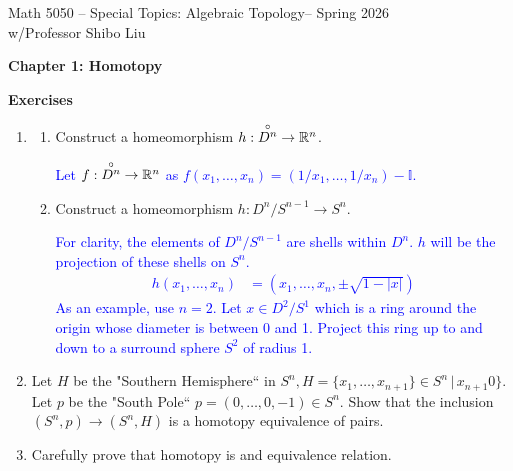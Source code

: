 \documentclass[12pt,a4paper]{report}
\newcommand{\CLASSNAME}{Math 5050 -- Special Topics: Algebraic Topology}
\newcommand{\PROFESSOR}{Professor Shibo Liu}
\newcommand{\SEMESTER}{Spring 2026}
\newcommand{\BLUE}[1]{\textcolor{blue}{#1}}
\newcommand{\OPEN}[1]{\overset{\circ}{#1}}
\begin{document}
\begin{center}
	\Large{\CLASSNAME -- \SEMESTER} \\
	\large{ w/\PROFESSOR}
\end{center}

\begin{center}
\textbf{\Large{Chapter 1: Homotopy}}
\end{center}

\HLINE

\noindent\textbf{Exercises}
\begin{enumerate}[label=1.3.\arabic*]
	\item \begin{enumerate}
		\item Construct a homeomorphism $h: \OPEN{D^n}\to \R^n$.
		
		\BLUE{Let $f: \OPEN{D^n}\to \R^n$ as $f(x_1, \dots, x_n) = (1/x_1, \dots, 1/x_n)-\mathbb{I}$.
		}
		\item Construct a homeomorphism $h: D^n/S^{n-1}\to S^n$.
		
		\BLUE{For clarity, the elements of $D^n/S^{n-1}$ are shells within $D^n$.  $h$ will be the projection of these shells on $S^n$.\begin{align*}
			h(x_1,\dots, x_n) &= (x_1,\dots, x_n, \pm\sqrt{1-|x|})
		\end{align*}As an example, use $n=2$.  Let $x \in D^2/S^1$ which is a ring around the origin whose diameter is between 0 and 1.  Project this ring up to and down to a surround sphere $S^2$ of radius 1.
		}
	\end{enumerate}
	
	\item Let $H$ be the "Southern Hemisphere`` in $S^n, H=\{x_1,\dots,x_{n+1}\} \in S^n \,|\, x_{n+1} 0\}$.  Let $p$ be the "South Pole`` $p=(0,\dots,0,-1)\in S^n$.  Show that the inclusion $(S^n, p)\to (S^n,H)$ is a homotopy equivalence of pairs.
	
	\item Carefully prove that homotopy is and equivalence relation.
	

\end{enumerate}
\end{document}
